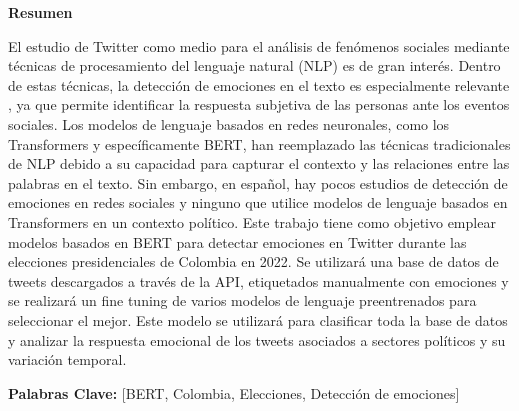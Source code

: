 \begin{center}
{\Large{\bf{Resumen}}}
\end{center}


El estudio de Twitter como medio para el análisis de fenómenos sociales mediante técnicas de procesamiento del lenguaje natural (NLP) es de gran interés. Dentro de estas técnicas, la detección de emociones en el texto es especialmente relevante , ya que permite identificar la respuesta subjetiva de las personas ante los eventos sociales. Los modelos de lenguaje basados en redes neuronales, como los Transformers y específicamente BERT, han reemplazado las técnicas tradicionales de NLP debido a su capacidad para capturar el contexto y las relaciones entre las palabras en el texto. Sin embargo, en español, hay pocos estudios de detección de emociones en redes sociales y ninguno que utilice modelos de lenguaje basados en Transformers en un contexto político. Este trabajo tiene como objetivo emplear modelos basados en BERT para detectar emociones en Twitter durante las elecciones presidenciales de Colombia en 2022. Se utilizará una base de datos de tweets descargados a través de la API, etiquetados manualmente con emociones y se realizará un fine tuning de varios modelos de lenguaje preentrenados para seleccionar el mejor. Este modelo se utilizará para clasificar toda la base de datos y analizar la respuesta emocional de los tweets asociados a sectores políticos y su variación temporal.

\vspace{4cm} %
\textbf{Palabras Clave:} [BERT, Colombia, Elecciones, Detección de emociones]

\clearpage
